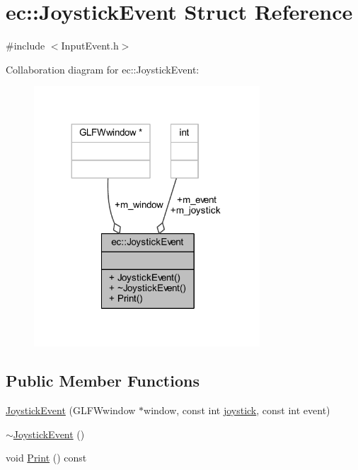 \hypertarget{structec_1_1_joystick_event}{}\section{ec\+:\+:Joystick\+Event Struct Reference}
\label{structec_1_1_joystick_event}


{\ttfamily \#include $<$Input\+Event.\+h$>$}



Collaboration diagram for ec\+:\+:Joystick\+Event\+:\nopagebreak
\begin{figure}[H]
\begin{center}
\leavevmode
\includegraphics[width=239pt]{structec_1_1_joystick_event__coll__graph}
\end{center}
\end{figure}
\subsection*{Public Member Functions}
\begin{DoxyCompactItemize}
\item 
\mbox{\hyperlink{structec_1_1_joystick_event_ac922516c15cb953f16fe666a796ab26e}{Joystick\+Event}} (G\+L\+F\+Wwindow $\ast$window, const int \mbox{\hyperlink{namespaceec_a5de6bdb8c4b2ed6e590e721ec998f964a2ed69833bf8cb33c80eaf0daa892400e}{joystick}}, const int event)
\item 
\mbox{\hyperlink{structec_1_1_joystick_event_a182ea7dcfcd2e363909eb8ea63a41df8}{$\sim$\+Joystick\+Event}} ()
\item 
void \mbox{\hyperlink{structec_1_1_joystick_event_a17fb7233002643d67d0c24b79c91b045}{Print}} () const
\end{DoxyCompactItemize}
